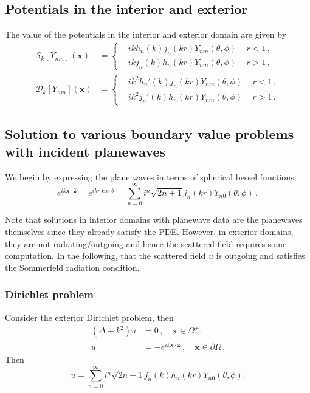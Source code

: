 \documentclass[11pt]{article}
\newcommand\bx{\boldsymbol x}
\newcommand\bz{\boldsymbol{z}}
\newcommand\cS{\mathcal{S}}
\newcommand\cD{\mathcal{D}}
\newcommand\pa{\partial}
\theoremstyle{definition}
\theoremstyle{remark}
\numberwithin{equation}{section}
\begin{document}
\subsection*{Potentials in the interior and exterior}
The value of the potentials in the interior and exterior domain are given by
\begin{equation}
\begin{aligned}
\cS_{k}[Y_{nm}](\bx) &=\begin{cases}
  & ik h_{n}(k)  j_{n}(kr) Y_{nm}(\theta, \phi) \, \quad r<1 \, ,\\
    & ik j_{n}(k) h_{n}(kr) Y_{nm}(\theta, \phi) \, \quad r>1 \, ,
  \end{cases} \, \\
  \cD_{k}[Y_{nm}](\bx) &=\begin{cases}
  & ik^2  h_{n}'(k) j_{n}(kr) Y_{nm}(\theta, \phi) \, \quad r<1 \, ,\\
    & ik^2 j_{n}'(k) h_{n}(kr) Y_{nm}(\theta, \phi) \, \quad r>1 \, .
  \end{cases}
\end{aligned}
\end{equation}

\subsection*{Solution to various boundary value problems with incident planewaves}
We begin by expressing the plane waves in terms of spherical bessel functions, 
\begin{equation}
e^{ik \bx \cdot \hat{\bz}} = e^{ik r \cos{\theta}} = \sum_{n=0}^{\infty} i^{n} \sqrt{2n + 1} j_{n}(kr) Y_{n0}(\theta, \phi) \, ,
\end{equation}

Note that solutions in interior domains with planewave data are the planewaves themselves since they already satisfy the 
PDE. However, in exterior domains, they are not radiating/outgoing and hence the scattered field requires some computation.  In the following, that the scattered field $u$ is outgoing and satisfies the Sommerfeld radiation condition.

\subsubsection{Dirichlet problem}
Consider the exterior Dirichlet problem, then
\begin{equation}
\begin{aligned}
(\Delta + k^2)u &= 0 \,, \quad \bx \in \Omega^{+},\\
u &= -e^{ik \bx \cdot \hat{\bz}} \,, \quad \bx \in \pa \Omega \,.
\end{aligned}
\end{equation}
Then
\begin{equation}
u = \sum_{n=0}^{\infty} i^{n} \sqrt{2n+1} j_{n}(k) h_{n}(kr) Y_{n0}(\theta, \phi)  .
\end{equation}
\end{document}
